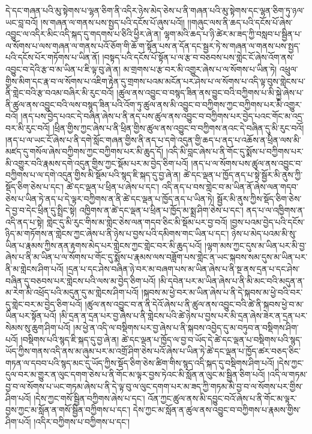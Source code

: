 དེ་དང་གཞན་པའི་མུ་སྟེགས་པ་ལྷན་ཅིག་ནི་འདིར་ཉེས་མེད་ཅེས་པ་ནི་གཞན་པའི་མུ་སྟེགས་དང་ལྷན་ཅིག་ཏུ་ཉལ་ཡང་བླ་བའོ། །ས་གཞན་ལ་གནས་པས་སྤྱད་པའི་དངོས་པོ་ཞུས་པའོ།། །།གཞུང་ལས་ནི་ཆད་པའི་དངོས་པོ་ཞེས་འབྱུང་ལ་འདིར་མིང་འདི་སྐད་དུ་གདགས་པ་ཅིའི་ཕྱིར་ཞེ་ན། ལྷག་མའི་ཆད་པ་ཉི་ཚེར་མ་ཟད་ཀྱི་བསླབ་པ་སྦྱིན་པ་ལ་སོགས་པ་ལས་གཞན་ལ་གནས་པའོ་ཅོག་གི་ཆོ་ག་སྟོན་པས་ན་དོན་དང་སྦྱར་ཏེ་ས་གཞན་ལ་གནས་པས་སྤྱད་པའི་དངོས་པོར་གཏོགས་པ་ཡིན་ནོ། །བསྟད་པའི་དངོས་པོ་སྟོན་པ་ལ་རྩ་བ་བཅབས་པས་གླེང་ངོ་ཞེས་འོག་ནས་འབྱུང་བ་དེའི་རྩ་བ་མ་ཡིན་པ་ཇི་ལྟ་བུ་ཞེ་ན། མ་གྲགས་པ་རྩ་བར་མི་འགྱུར་ཞེས་པ་ལ་སོགས་པ་ཡིན་ཏེ། འཕྲུལ་གྱིས་མིག་དང་རྣ་བ་ལ་སོགས་པ་འཇིག་རྟེན་དུ་གྲགས་པའམ་མངོན་པར་ཤེས་པ་ལ་སོགས་པ་འདི་ལྟ་བུས་གླེངས་པ་ནི་གླེང་བའི་རྩ་བའམ་བཞིར་མི་རུང་བའོ། །ཚུལ་ནས་འབྱུང་བ་བསྙད་ཟིན་ནས་བྱུང་བའི་བཀྱིགས་པ་མི་སྐྱེ་ཞེས་པ་ནི་ཚུལ་ནས་འབྱུང་བའི་ལས་བསྙད་ཟིན་པའི་འོག་ཏུ་ཚུལ་ནས་མི་འབྱུང་བ་བཀྱིགས་ཀྱང་བཀྱིགས་པར་མི་འགྱུར་བའོ། །ནད་པས་བྱེད་པའང་དེ་བཞིན་ཞེས་པ་ནི་ནད་པས་ཚུལ་ནས་འབྱུང་བ་བཀྱིགས་པར་བྱེད་པའང་གོང་མ་འདྲ་བར་མི་རུང་བའོ། །ཕྲིན་གྱིས་ཀྱང་ཞེས་པ་ནི་ཕྲིན་གྱིས་ཚུལ་ནས་འབྱུང་བ་བཀྱིགས་ནའང་དེ་བཞིན་དུ་མི་རུང་བའོ། །ནད་པ་ལ་ཡང་ངོ་ཞེས་པ་ནི་དགེ་སློང་གཞན་གྱིས་ནི་ནད་པ་དགེ་འདུན་གྱི་ཆད་པ་ནད་པ་འཆོས་ན་ཕྲིན་ལས་མི་མཛད་དུ་གསོལ་ཞེས་བཀྱིགས་ཀྱང་བཀྱིགས་པར་མི་ཆུད་དོ། །འདི་མི་བླང་ཞེས་པ་ནི་གོང་དུ་སྨོས་པ་བཀྱིགས་པར་མི་འགྱུར་བའི་རྣམས་དགེ་འདུན་གྱིས་ཀྱང་སྡོམ་པར་མ་བྱེད་ཅིག་པའོ། །ནད་པ་ལ་སོགས་པས་ཚུལ་ནས་འབྱུང་བ་བཀྱིགས་པ་ལ་དགེ་འདུན་གྱིས་མི་སྡོམ་པའི་སྙད་ཇི་སྐད་དུ་བྱ་ཞེ་ན། ཚེ་དང་ལྡན་པ་ཁྱོད་ནད་པ་སྟེ་སྦྱོར་མི་ནུས་ཀྱི་སྡོད་ཅིག་ཅེས་པ་དང་། ཚེ་དང་ལྡན་པ་ཕྲིན་པ་ཞེས་པ་དང་། འདི་ནད་པ་བས་གླེང་བ་མ་ཡིན་ནོ་ཞེས་ལན་གདབ་ཅེས་པ་ཡིན་ཏེ་ནད་པ་དེ་ལྟར་བཀྱིགས་ན་ནི་ཚེ་དང་ལྡན་པ་ཁྱོད་ནད་པ་ཡིན་ཏེ། སྦྱོར་མི་ནུས་ཀྱིས་སྡོད་ཅིག་ཅེས་དེ་བྱ་བ་དེང་ཕྲིན་དུ་སྤྲིང་སྟེ། འཁྱིགས་ན་ཚེ་དང་ལྡན་པ་ཕྲིན་པ་ཁྱོད་མ་སྨྲ་ཤིག་ཅེས་པ་དང་། ནད་པ་ལ་འཁྱིགས་ན་འདི་ནད་པ་སྟེ། གླེང་དུ་མི་རུང་གིས་མ་གླེང་ཅེས་ལན་གདབ་ཅིང་མི་སྡོམ་པར་བྱ་བའོ། །བྱས་པའམ་བྱེད་པའི་དངོས་ཉིད་མ་གཏོགས་ན་གླེངས་ཀྱང་ཞེས་པ་ནི་ཉེས་པ་བྱས་པའི་དམིགས་གང་ཡིན་པ་དང་། ཉེས་པ་མེད་པའམ་མི་སུ་ཡིན་པ་རྣམས་ཀྱིས་ནན་རྟགས་མེད་པར་གླེངས་ཀྱང་གླེང་བར་མི་ཆུད་པའོ། །ལྷག་མས་ཀྱང་དུས་མ་ཡིན་པར་མི་བྱ་ཞེས་པ་ནི་མ་ཡིན་པ་ལ་སོགས་པ་གོང་དུ་སྨོས་པ་རྣམས་ལས་བཟློག་པས་གླེང་ན་ཡང་སྐབས་སམ་དུས་མ་ཡིན་པར་ནི་མ་གླེངས་ཤིག་པའོ། །དྲན་པ་དང་ཤེས་བཞིན་ཉེ་བར་མ་བཞག་པས་མ་ཡིན་ཞེས་པ་ནི་སྔ་ནས་དྲན་པ་དང་ཤེས་བཞིན་དུ་བཅབས་པར་གླེངས་པའི་ལས་མ་བྱེད་ཅིག་པའོ། །མི་དབེན་པར་མ་ཡིན་ཞེས་པ་ནི་མི་མང་བའི་མདུན་ན་མ་རེག་མི་འཕྲོད་པའི་མདུན་དུ་མ་གླེངས་ཤིག་པའོ། །སྐབས་མ་ཕྱེ་བར་མ་ཡིན་ཞེས་པ་ནི་དེ་སྐབས་མ་ཕྱེ་བའི་བར་དུ་གླེང་བར་མ་བྱེད་ཅིག་པའོ། །ཚུལ་ནས་འབྱུང་བ་ན་ནི་དེའོ་ཞེས་པ་ནི་ཚུལ་ནས་འབྱུང་བའི་ཚེ་ནི་སྐབས་ཕྱེ་བ་མ་ཡིན་པར་སྟོན་པའོ། །མི་དྲན་ན་དྲན་པར་བྱ་ཞེས་པ་ནི་གླེངས་པའི་ཚེ་ཉེས་པ་བྱས་པར་མི་དྲན་ཞེས་ཟེར་ན་དྲན་པར་སེམས་སུ་ཆུག་ཤིག་པའོ། །མ་ཕྱེ་ན་འདི་ལ་བསྡིགས་པར་བྱ་ཞེས་པ་ནི་སྐབས་འབྱེད་དུ་མ་བཏུབ་ན་བསྡིགས་ཤིག་པའོ། །བསྡིགས་པའི་སྙད་ཇི་སྐད་དུ་བྱ་ཞེ་ན། ཚེ་དང་ལྡན་པ་ཁྱོད་ལ་བྱ་བ་ཡོད་དེ་ཚེ་དང་ལྡན་པ་བསྡིགས་པའི་སྙད་ཡོད་ཀྱིས་གནས་འདི་ནས་མ་ཞུམ་པར་མ་འགྲོ་ཤིག་ཅེས་པའོ་ཞེས་པ་ཡིན་ཏེ་ཚེ་དང་ལྡན་པ་ཁྱོད་ཚར་བཅད་ཅིང་གཏན་ལ་དབབ་པའི་སྙད་མང་དུ་ཡོད་ཀྱིས་སྡོད་ཅིག་ཅེས་ཚིག་གིས་སྙད་འདི་སྐད་དུ་བསྡིགས་ཤིག་པའོ། །དེས་ཀྱང་དུལ་བར་མ་གྱུར་ན་ལུང་དགག་ཅེས་པ་ནི་གོང་མ་ལྟར་བྱས་ཏེའང་མི་སློན་ན་ལུང་མ་སྦྱིན་ཅིག་པའོ། །འདི་ལ་གཏམ་བྱ་བ་ལ་སོགས་པ་ཡང་གཏམ་ཞེས་པ་ནི་དེ་ལྟ་བུ་ལ་ལུང་དགག་པར་མ་ཟད་ཀྱི་གཏམ་མི་བྱ་བ་ལ་སོགས་པར་གྱིས་ཤིག་པའོ། །དེས་ཀྱང་གསོ་སྦྱིན་བཀྱིགས་ཞེས་པ་དང་། འོན་ཀྱང་ཚུལ་ནས་མི་དབྱུང་བའོ་ཞེས་པ་ནི་གོང་མ་ལྟར་བྱས་ཀྱང་མ་སློན་ན་གསོ་སྦྱིན་བཀྱིགས་པ་དང་། དེས་ཀྱང་མ་སློན་ན་ཚུལ་ནས་འབྱུང་བ་བཀྱིགས་པ་རྣམས་གྱིས་ཤིག་པའོ། །འདིར་བཀྱིགས་པ་བཀྱིགས་པ་དང་། 